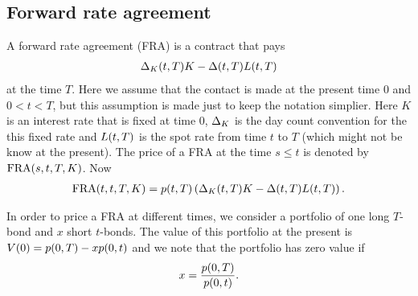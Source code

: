 \subsection{Forward rate agreement}

A forward rate agreement (FRA) is a contract that pays
\begin{align}
\Delta_K(t,T) K - \Delta(t,T) L(t,T)
\end{align}
at the time $T$. Here we assume that the contact is made at the present time $0$ and $0 < t < T$, but this assumption is made just to keep the notation simplier. Here $K$ is an interest rate that is fixed at time $0$, $\Delta_K$ is the day count convention for the this fixed rate and $L(t,T)$ is the spot rate from time $t$ to $T$ (which might not be know at the present). The price of a FRA at the time $s \leq t$ is denoted by $\operatorname{\mathrm{FRA}}(s,t,T,K)$. Now
\begin{align}
\operatorname{\mathrm{FRA}}(t,t,T,K) = p(t,T) \left( \Delta_K(t,T) K - \Delta(t,T) L(t,T) \right) .
\end{align}

In order to price a FRA at different times, we consider a portfolio of one long $T$-bond and $x$ short $t$-bonds. The value of this portfolio at the present is $V(0) = p(0,T) - x p(0,t)$ and we note that the portfolio has zero value if
\begin{align}
\label{FRAzeroprice}
x = \frac{p(0,T)}{p(0,t)}.
\end{align}

